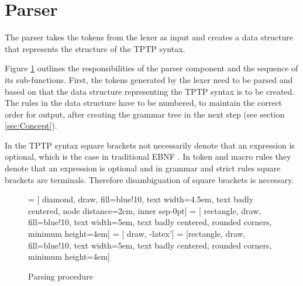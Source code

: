 \section{Parser}\label{sec:ConceptParser}
The parser takes the tokens from the lexer as input and creates a data structure that represents the structure of the \ac{TPTP} syntax.

Figure \ref{fig:ConceptParserFlow} outlines the responsibilities of the parser component and the sequence of its sub-functions.
First, the tokens generated by the lexer need to be parsed and based on that the data structure representing the \ac{TPTP} syntax is to be created.
The rules in the data structure have to be numbered, to maintain the correct order for output, after creating the grammar tree in the next step (see section \ref{sec:Concept}).

In the \ac{TPTP} syntax square brackets not necessarily denote that an expression is optional, which is the case in traditional \ac{EBNF} .
In token and macro rules they denote that an expression is optional and in grammar and strict rules square brackets are terminals.
Therefore disambiguation of square brackets is necessary.
\begin{figure}[H]
 = [ diamond, draw, fill=blue!10, text width=4.5em, text badly centered, node distance=2cm, inner sep-0pt]  
 = [ rectangle, draw, fill=blue!10, text width=5em, text badly centered, rounded corners, minimum height=4em]  
 = [ draw, -latex']  
 = [rectangle, draw, fill=blue!10, text width=5em, text badly centered, rounded corners, minimum height=4em]  
\begin{center}
\end{center}
\caption{Parsing procedure}
\label{fig:ConceptParserFlow}
\end{figure}

